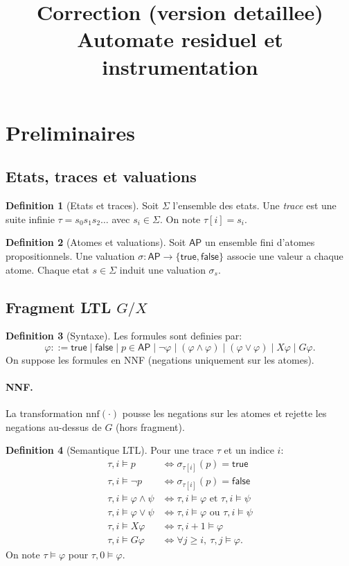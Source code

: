 \documentclass[11pt]{article}
\title{Correction (version detaillee)\\Automate residuel et instrumentation}
\author{}
\date{}
\newcommand{\AP}{\mathsf{AP}}
\newcommand{\eval}{\models}
\newcommand{\nnf}{\mathrm{nnf}}
\newcommand{\True}{\mathsf{true}}
\newcommand{\False}{\mathsf{false}}
\theoremstyle{definition}
\newtheorem{definition}{Definition}
\begin{document}
\maketitle

\section{Preliminaires}

\subsection{Etats, traces et valuations}

\begin{definition}[Etats et traces]
Soit $\Sigma$ l'ensemble des etats. Une \emph{trace} est une suite infinie
$\tau = s_0 s_1 s_2 \ldots$ avec $s_i \in \Sigma$. On note $\tau[i] = s_i$.
\end{definition}

\begin{definition}[Atomes et valuations]
Soit $\AP$ un ensemble fini d'atomes propositionnels. Une valuation
$\sigma : \AP \to \{\True,\False\}$ associe une valeur a chaque atome.
Chaque etat $s \in \Sigma$ induit une valuation $\sigma_s$.
\end{definition}

\subsection{Fragment LTL $G/X$}

\begin{definition}[Syntaxe]
Les formules sont definies par:
\[
\varphi ::= \True \mid \False \mid p \in \AP \mid \neg\varphi
\mid (\varphi \wedge \varphi) \mid (\varphi \vee \varphi)
\mid X\varphi \mid G\varphi.
\]
On suppose les formules en NNF (negations uniquement sur les atomes).
\paragraph{NNF.}
La transformation $\nnf(\cdot)$ pousse les negations sur les atomes et
rejette les negations au-dessus de $G$ (hors fragment).
\end{definition}

\begin{definition}[Semantique LTL]
Pour une trace $\tau$ et un indice $i$:
\begin{align*}
\tau,i \eval p &\iff \sigma_{\tau[i]}(p) = \True \\
\tau,i \eval \neg p &\iff \sigma_{\tau[i]}(p) = \False \\
\tau,i \eval \varphi \wedge \psi &\iff \tau,i \eval \varphi \text{ et } \tau,i \eval \psi \\
\tau,i \eval \varphi \vee \psi &\iff \tau,i \eval \varphi \text{ ou } \tau,i \eval \psi \\
\tau,i \eval X\varphi &\iff \tau,i+1 \eval \varphi \\
\tau,i \eval G\varphi &\iff \forall j \ge i,\ \tau,j \eval \varphi.
\end{align*}
On note $\tau \eval \varphi$ pour $\tau,0 \eval \varphi$.
\end{definition}
\end{document}
